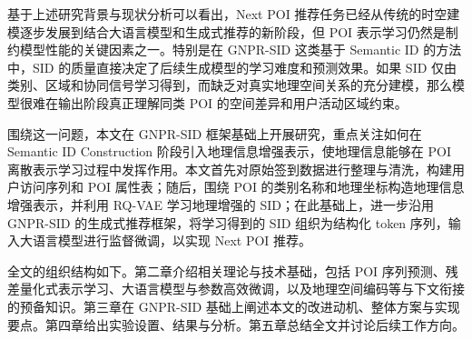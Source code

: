 基于上述研究背景与现状分析可以看出，Next POI 推荐任务已经从传统的时空建模逐步发展到结合大语言模型和生成式推荐的新阶段，但 POI 表示学习仍然是制约模型性能的关键因素之一。特别是在 GNPR-SID 这类基于 Semantic ID 的方法中，SID 的质量直接决定了后续生成模型的学习难度和预测效果。如果 SID 仅由类别、区域和协同信号学习得到，而缺乏对真实地理空间关系的充分建模，那么模型很难在输出阶段真正理解同类 POI 的空间差异和用户活动区域约束。

围绕这一问题，本文在 GNPR-SID 框架基础上开展研究，重点关注如何在 Semantic ID Construction 阶段引入地理信息增强表示，使地理信息能够在 POI 离散表示学习过程中发挥作用。本文首先对原始签到数据进行整理与清洗，构建用户访问序列和 POI 属性表；随后，围绕 POI 的类别名称和地理坐标构造地理信息增强表示，并利用 RQ-VAE 学习地理增强的 SID；在此基础上，进一步沿用 GNPR-SID 的生成式推荐框架，将学习得到的 SID 组织为结构化 token 序列，输入大语言模型进行监督微调，以实现 Next POI 推荐。

全文的组织结构如下。第二章介绍相关理论与技术基础，包括 POI 序列预测、残差量化式表示学习、大语言模型与参数高效微调，以及地理空间编码等与下文衔接的预备知识。第三章在 GNPR-SID 基础上阐述本文的改进动机、整体方案与实现要点。第四章给出实验设置、结果与分析。第五章总结全文并讨论后续工作方向。